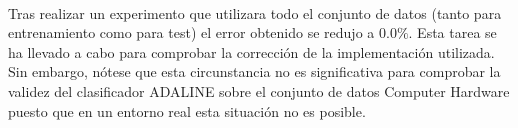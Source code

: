 \documentclass{article}
\begin{document}
		\paragraph{}
		Tras realizar un experimento que utilizara todo el conjunto de datos (tanto para entrenamiento como para test) el error obtenido se redujo a $0.0\%$. Esta tarea se ha llevado a cabo para comprobar la corrección de la implementación utilizada. Sin embargo, nótese que esta circunstancia no es significativa para comprobar la validez del clasificador ADALINE sobre el conjunto de datos Computer Hardware puesto que en un entorno real esta situación no es posible.



	\nocite{subject:taa}
  
  
\end{document}
